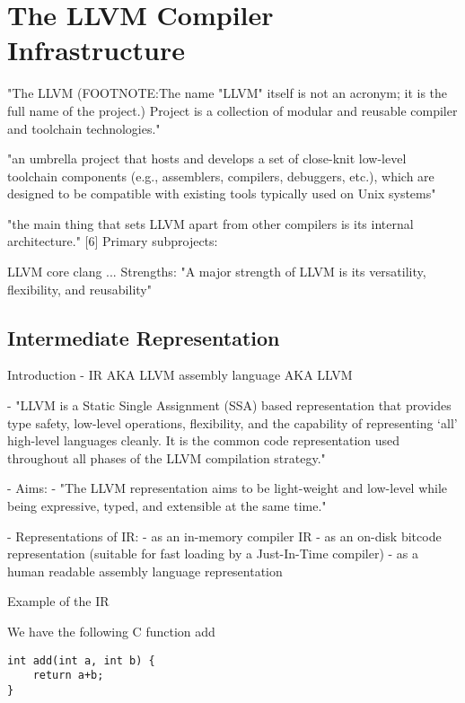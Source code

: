 \documentclass[12pt, twoside]{fithesis2}
\renewcommand{\_}{\leavevmode \kern0.07em\vbox{\hrule width0.4em}}
\begin{document}
\chapter{The LLVM Compiler Infrastructure}
\label{chap:llvm}

"The LLVM (FOOTNOTE:The name "LLVM" itself is not an acronym; it is the full
name of the project.) Project is a collection of modular and reusable compiler
and toolchain technologies." \cite{llvm}

"an umbrella project that hosts and develops a set of close-knit low-level
toolchain components (e.g., assemblers, compilers, debuggers, etc.), which are
designed to be compatible with existing tools typically used on Unix systems"

"the main thing that sets LLVM apart from other compilers is its internal
architecture." [6] Primary subprojects:

LLVM core clang ...  Strengths: "A major strength of LLVM is its versatility,
flexibility, and reusability"

\section{Intermediate Representation}
\label{sec:llvm-ir}

Introduction
- IR AKA LLVM assembly language AKA LLVM

- "LLVM is a Static Single Assignment (SSA) based representation that provides
type safety, low-level operations, flexibility, and the capability of
representing ‘all’ high-level languages cleanly. It is the common code
representation used throughout all phases of the LLVM compilation strategy."

- Aims:
 - "The LLVM representation aims to be light-weight and low-level while being
 expressive, typed, and extensible at the same time."

- Representations of IR:
 - as an in-memory compiler IR
 - as an on-disk bitcode representation (suitable for fast loading by a
 Just-In-Time compiler)
 - as a human readable assembly language representation

Example of the IR

We have the following C function add

\begin{verbatim}
int add(int a, int b) {
    return a+b;
}
\end{verbatim}
\end{document}

